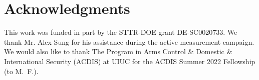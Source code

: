 \documentclass[preprint,final]{elsarticle}
\begin{document}
\section*{Acknowledgments}
This work was funded in part by the STTR-DOE grant DE-SC0020733. We thank Mr. Alex Sung for his assistance during the active measurement campaign.{ We would also like to thank The Program in Arms Control \& Domestic \& International Security (ACDIS) at UIUC for the ACDIS Summer 2022 Fellowship (to M.~F.).}

\end{document}
